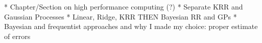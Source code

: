* Chapter/Section on high performance computing (?)
* Separate KRR and Gaussian Processes
* Linear, Ridge, KRR THEN Bayesian RR and GPs
* Bayesian and frequentist approaches and why I made my choice: proper estimate of errors
